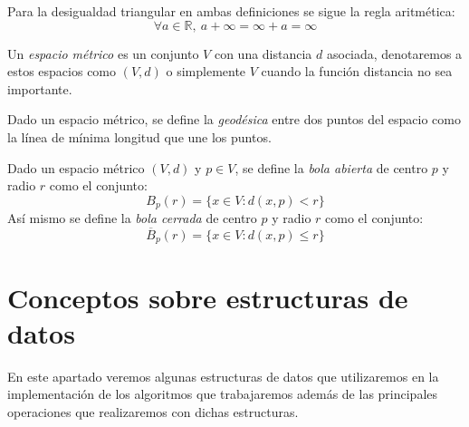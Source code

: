 Para la desigualdad triangular en ambas definiciones se sigue la regla aritmética:
$$\forall a\in \mathbb{R},\ a+\infty=\infty+a=\infty$$

\begin{definicion}
	Un \textit{espacio métrico} es un conjunto $V$ con una distancia $d$ asociada, denotaremos a estos espacios como $(V,d)$ o simplemente $V$ cuando la función distancia no sea importante.
\end{definicion}

\begin{definicion}
	Dado un espacio métrico, se define la \textit{geodésica} entre dos puntos del espacio como la línea de mínima longitud que une los puntos.
\end{definicion}

\begin{definicion}
	Dado un espacio métrico $(V,d)$ y $p \in V$, se define la \textit{bola abierta} de centro $p$ y radio $r$ como el conjunto:
	$$B_p(r) = \{x \in V : d(x,p) < r\}$$
	Así mismo se define la \textit{bola cerrada} de centro $p$ y radio $r$ como el conjunto:
	$$\overline B_p(r) = \{x \in V : d(x,p) \leq r\}$$
\end{definicion}




\section{Conceptos sobre estructuras de datos}

En este apartado veremos algunas estructuras de datos que utilizaremos en la implementación de los algoritmos que trabajaremos además de las principales operaciones que realizaremos con dichas estructuras.

